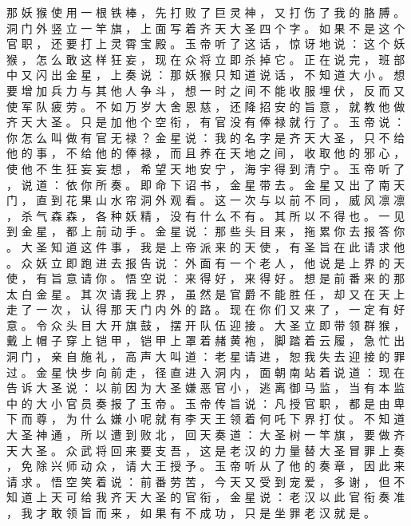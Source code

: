 {那 妖 猴 使 用 一 根 铁 棒 ， 先 打 败 了 巨 灵 神 ， 又 打 伤 了 我 的 胳 膊 。
洞 门 外 竖 立 一 竿 旗 ， 上 面 写 着 齐 天 大 圣 四 个 字 。
如 果 不 是 这 个 官 职 ， 还 要 打 上 灵 霄 宝 殿 。
玉 帝 听 了 这 话 ， 惊 讶 地 说 ： 这 个 妖 猴 ， 怎 么 敢 这 样 狂 妄 ， 现 在 众 将 立 即 杀 掉 它 。
正 在 说 完 ， 班 部 中 又 闪 出 金 星 ， 上 奏 说 ： 那 妖 猴 只 知 道 说 话 ， 不 知 道 大 小 。
想 要 增 加 兵 力 与 其 他 人 争 斗 ， 想 一 时 之 间 不 能 收 服 埋 伏 ， 反 而 又 使 军 队 疲 劳 。
不 如 万 岁 大 舍 恩 慈 ， 还 降 招 安 的 旨 意 ， 就 教 他 做 齐 天 大 圣 。
只 是 加 他 个 空 衔 ， 有 官 没 有 俸 禄 就 行 了 。
玉 帝 说 ： 你 怎 么 叫 做 有 官 无 禄 ？ 金 星 说 ： 我 的 名 字 是 齐 天 大 圣 ， 只 不 给 他 的 事 ， 不 给 他 的 俸 禄 ， 而 且 养 在 天 地 之 间 ， 收 取 他 的 邪 心 ， 使 他 不 生 狂 妄 妄 想 ， 希 望 天 地 安 宁 ， 海 宇 得 到 清 宁 。
玉 帝 听 了 ， 说 道 ： 依 你 所 奏 。
即 命 下 诏 书 ， 金 星 带 去 。
金 星 又 出 了 南 天 门 ， 直 到 花 果 山 水 帘 洞 外 观 看 。
这 一 次 与 以 前 不 同 ， 威 风 凛 凛 ， 杀 气 森 森 ， 各 种 妖 精 ， 没 有 什 么 不 有 。
其 所 以 不 得 也 。
一 见 到 金 星 ， 都 上 前 动 手 。
金 星 说 ： 那 些 头 目 来 ， 拖 累 你 去 报 答 你 。 大 圣 知 道 这 件 事 ， 我 是 上 帝 派 来 的 天 使 ， 有 圣 旨 在 此 请 求 他 。
众 妖 立 即 跑 进 去 报 告 说 ： 外 面 有 一 个 老 人 ， 他 说 是 上 界 的 天 使 ， 有 旨 意 请 你 。
悟 空 说 ： 来 得 好 ， 来 得 好 。
想 是 前 番 来 的 那 太 白 金 星 。
其 次 请 我 上 界 ， 虽 然 是 官 爵 不 能 胜 任 ， 却 又 在 天 上 走 了 一 次 ， 认 得 那 天 门 内 外 的 路 。
现 在 你 们 又 来 了 ， 一 定 有 好 意 。
令 众 头 目 大 开 旗 鼓 ， 摆 开 队 伍 迎 接 。
大 圣 立 即 带 领 群 猴 ， 戴 上 帽 子 穿 上 铠 甲 ， 铠 甲 上 罩 着 赭 黄 袍 ， 脚 踏 着 云 履 ， 急 忙 出 洞 门 ， 亲 自 施 礼 ， 高 声 大 叫 道 ： 老 星 请 进 ， 恕 我 失 去 迎 接 的 罪 过 。
金 星 快 步 向 前 走 ， 径 直 进 入 洞 内 ， 面 朝 南 站 着 说 道 ： 现 在 告 诉 大 圣 说 ： 以 前 因 为 大 圣 嫌 恶 官 小 ， 逃 离 御 马 监 ， 当 有 本 监 中 的 大 小 官 员 奏 报 了 玉 帝 。
玉 帝 传 旨 说 ： 凡 授 官 职 ， 都 是 由 卑 下 而 尊 ， 为 什 么 嫌 小 呢 就 有 李 天 王 领 着 何 吒 下 界 打 仗 。
不 知 道 大 圣 神 通 ， 所 以 遭 到 败 北 ， 回 天 奏 道 ： 大 圣 树 一 竿 旗 ， 要 做 齐 天 大 圣 。
众 武 将 回 来 要 支 吾 ， 这 是 老 汉 的 力 量 替 大 圣 冒 罪 上 奏 ， 免 除 兴 师 动 众 ， 请 大 王 授 予 。
玉 帝 听 从 了 他 的 奏 章 ， 因 此 来 请 求 。
悟 空 笑 着 说 ： 前 番 劳 苦 ， 今 天 又 受 到 宠 爱 ， 多 谢 ， 但 不 知 道 上 天 可 给 我 齐 天 大 圣 的 官 衔 ， 金 星 说 ： 老 汉 以 此 官 衔 奏 准 ， 我 才 敢 领 旨 而 来 ， 如 果 有 不 成 功 ， 只 是 坐 罪 老 汉 就 是 。
}
